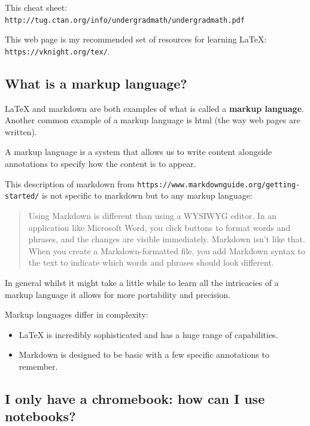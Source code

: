 This cheat sheet: \texttt{http://tug.ctan.org/info/undergradmath/undergradmath.pdf}


This web page is my recommended set of resources for learning LaTeX:
\texttt{https://vknight.org/tex/}.


\subsection{What is a markup language?}
\label{\detokenize{tools-for-mathematics/01-using-notebooks/why/main:what-is-a-markup-language}}

\LaTeX\; and markdown are both examples of what is called a \textbf{markup language}.
Another common example of a markup language is html (the way web pages are
written).


A markup language is a system that allows us to write content alongside
annotations to specify how the content is to appear.


This description of markdown from
\texttt{https://www.markdownguide.org/getting-started/} is not specific to markdown but
to any markup language:
\begin{quote}


Using Markdown is different than using a WYSIWYG editor. In an application
like Microsoft Word, you click buttons to format words and phrases, and the
changes are visible immediately. Markdown isn’t like that. When you create a
Markdown-formatted file, you add Markdown syntax to the text to indicate which
words and phrases should look different.
\end{quote}


In general whilst it might take a little while to learn all the intricacies of a
markup language it allows for more portability and precision.


Markup languages differ in complexity:
\begin{itemize}
\item 

\LaTeX\; is incredibly sophisticated and has a huge range of capabilities.

\item 

Markdown is designed to be basic with a few specific annotations to remember.

\end{itemize}


\subsection{I only have a chromebook: how can I use notebooks?}

